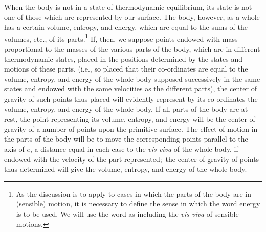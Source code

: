 \documentclass[11pt]{article}
\newcommand{\visviva}{\emph{vis viva}}
\begin{document}
When the body is not in a state of thermodynamic equilibrium, its state is not one of those which are represented by our surface. The body, however, as a whole has a certain volume, entropy, and energy, which are equal to the sums of the volumes, etc., of its parts.\footnote{As the discussion is to apply to cases in which the parts of the body are in (sensible) motion, it is necessary to define the sense in which the word energy is to be used. We will use the word as including the \visviva{} of sensible motions.} If, then, we suppose points endowed with mass proportional to the masses of the various parts of the body, which are in different thermodynamic states, placed in the positions determined by the states and motions of these parts, (i.e., so placed that their co-ordinates are equal to the volume, entropy, and energy of the whole body supposed successively in the same states and endowed with the same velocities as the different parts), the center of gravity of such points thus placed will evidently represent by its co-ordinates the volume, entropy, and energy of the whole body. If all parts of the body are at rest, the point representing its volume, entropy, and energy will be the center of gravity of a number of points upon the primitive surface. The effect of motion in the parts of the body will be to move the corresponding points parallel to the axis of $e$, a distance equal in each case to the \visviva{} of the whole body, if endowed with the velocity of the part represented;--the center of gravity of points thus determined will give the volume, entropy, and energy of the whole body.
\end{document}
